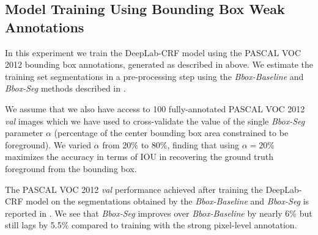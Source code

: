 \subsection{Model Training Using Bounding Box Weak Annotations}
\label{sec:test_bbox}

In this experiment we train the DeepLab-CRF model using the PASCAL VOC
2012 bounding box annotations, generated as described in
 above. We estimate the training set segmentations
in a pre-processing step using the \textsl{Bbox-Baseline} and
\textsl{Bbox-Seg} methods described in .

We assume that we also have access to 100 fully-annotated PASCAL VOC
2012 \textsl{val} images which we have used to cross-validate the
value of the single \textsl{Bbox-Seg} parameter $\alpha$ (percentage
of the center bounding box area constrained to be foreground). We
varied $\alpha$ from 20\% to 80\%, finding that using $\alpha = 20\%$
maximizes the accuracy in terms of IOU in recovering the ground truth
foreground from the bounding box.


The PASCAL VOC 2012 \textsl{val} performance achieved after training
the DeepLab-CRF model on the segmentations obtained by the
\textsl{Bbox-Baseline} and \textsl{Bbox-Seg} is reported in
. We see that \textsl{Bbox-Seg} improves over
\textsl{Bbox-Baseline} by nearly 6\% but still lags by 5.5\% compared
to training with the strong pixel-level annotation.

\begin{table}
  \centering
  \caption{DeepLab-CRF VOC 2012 \textsl{val} IOU (\%) results
    using bounding box weak annotations \vs strong annotation in
    training.}
  \label{tb:bbox_annot}
\end{table}

